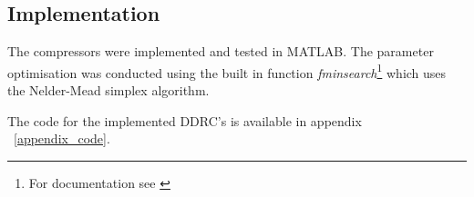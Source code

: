 \documentclass[../main2.tex]{subfiles}
\begin{document}
\subsection{Implementation} \label{method_implementation}
The compressors were implemented and tested in MATLAB. The parameter optimisation was conducted using the built in function \emph{fminsearch}\footnote{For documentation see \cite{fminsearch}} which uses the Nelder-Mead simplex algorithm. 

The code for the implemented DDRC's is available in appendix ~\ref{appendix_code}.
%
%
%
\end{document}
